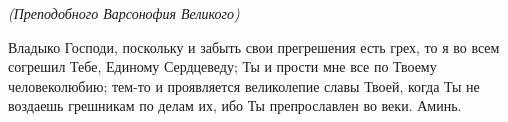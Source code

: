 \normalfont{} 


\mychapterending

 


\itshape (Преподобного Варсонофия Великого) 

\normalfont{}

Владыко Господи, поскольку и забыть свои прегрешения есть грех, то я во всем согрешил Тебе, Единому Сердцеведу; Ты и прости мне все по Твоему человеколюбию; тем-то и проявляется великолепие славы Твоей, когда Ты не воздаешь грешникам по делам их, ибо Ты препрославлен во веки. Аминь. 


\mychapterending